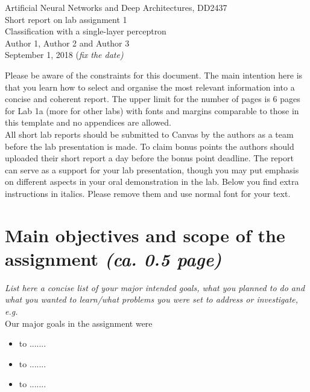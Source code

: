 \documentclass[a4paper]{article}
\begin{document}
\begin{center}
  {\large Artificial Neural Networks and Deep Architectures, DD2437}\\
  \vspace{7mm}
  {\huge Short report on lab assignment 1\\[1ex]}
  {\Large Classification with a single-layer perceptron}\\
  \vspace{8mm}  
  {\Large Author 1, Author 2 and Author 3\\}
  \vspace{4mm}
  {\large September 1, 2018 (\it{fix the date})\\}
\end{center}

\begin{framed}
Please be aware of the constraints for this document. The main intention here is that you learn how to select and organise the most relevant information into a concise and coherent report. The upper limit for the number of pages is 6 pages for Lab 1a (more for other labs) with fonts and margins comparable to those in this template and no appendices are allowed. \\
All short lab reports should be submitted to Canvas by the authors as a team before the lab presentation is made. To claim bonus points the authors should uploaded their short report a day before the bonus point deadline. The report can serve as a support for your lab presentation, though you may put emphasis on different aspects in your oral demonstration in the lab.
Below you find extra instructions in italics. Please remove them and use normal font for your text.
\end{framed}

\section{Main objectives and scope of the assignment \normalsize{\textit{(ca. 0.5 page)}}}

\textit{List here a concise list of your major intended goals, what you planned to do and what you wanted to learn/what problems you were set to address or investigate, e.g.}\\
Our major goals in the assignment were  
\begin{itemize}
\item to .......
\item to .......
\item to ....... 
\end{itemize}
\end{document}
